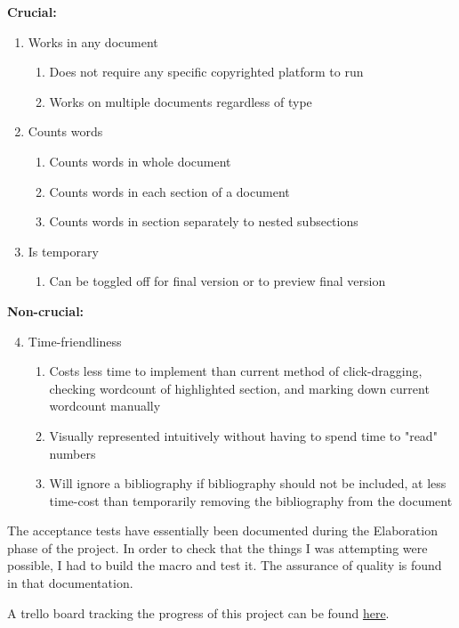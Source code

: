 \documentclass[10pt]{article}
\begin{document}
\textbf{Crucial:}
\begin{enumerate}
    \item Works in any document
    \begin{enumerate}
        \item Does not require any specific copyrighted platform to run
        \item Works on multiple documents regardless of type
    \end{enumerate}
    \item Counts words
    \begin{enumerate}
        \item Counts words in whole document
        \item Counts words in each section of a document
        \item Counts words in section separately to nested subsections
    \end{enumerate}
    \item Is temporary
    \begin{enumerate}
        \item Can be toggled off for final version or to preview final version
    \end{enumerate}
\end{enumerate}

\textbf{Non-crucial:}
\begin{enumerate}\setcounter{enumi}{3}
    \item Time-friendliness
    \begin{enumerate}
        \item Costs less time to implement than current method of click-dragging, checking wordcount of highlighted section, and marking down current wordcount manually
        \item Visually represented intuitively without having to spend time to "read" numbers
        \item Will ignore a bibliography if bibliography should not be included, at less time-cost than temporarily removing the bibliography from the document
    \end{enumerate}
\end{enumerate}

 
The acceptance tests have essentially been documented during the Elaboration phase of the project. In order to check that the things I was attempting were possible, I had to build the macro and test it. The assurance of quality is found in that documentation.

A trello board tracking the progress of this project can be found \href{https://trello.com/b/upIfqOv2}{here}.
\end{document}
